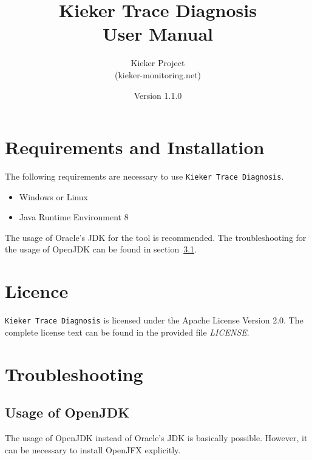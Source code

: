 \documentclass{article}
\title{Kieker Trace Diagnosis\\User Manual}
\date{Version 1.1.0}
\author{Kieker Project\\(kieker-monitoring.net)}
\begin{document}
  \newcommand{\KiekerTraceDiagnosis}[0]{\texttt{Kieker Trace Diagnosis}}
  \newcommand{\file}[1]{\textit{#1}}

  \maketitle

  \section{Requirements and Installation}
  The following requirements are necessary to use \KiekerTraceDiagnosis{}.
  \begin{itemize}
    \item Windows or Linux
    \item Java Runtime Environment 8
  \end{itemize}
  The usage of Oracle's JDK for the tool is recommended. The troubleshooting for the usage of OpenJDK can be found in section~\ref{OpenJDK}.

  \section{Licence}
  \KiekerTraceDiagnosis{} is licensed under the Apache License Version 2.0. The complete license text can be found in the provided file \file{LICENSE}.

  \section{Troubleshooting}

  \subsection{Usage of OpenJDK}\label{OpenJDK}
  The usage of OpenJDK instead of Oracle's JDK is basically possible. However, it can be necessary to install OpenJFX explicitly.
\end{document}
